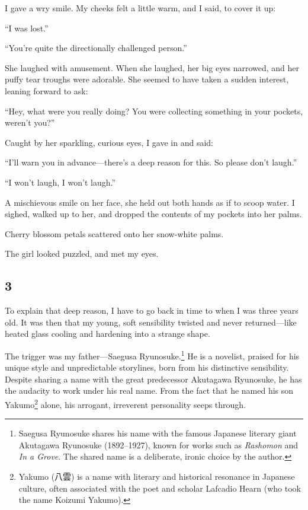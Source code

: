 \documentclass[
    a4paper,
    12pt,
    twoside,
    openany,
    UTF8,
    fontset=windows
]{ctexbook}
\begin{document}
I gave a wry smile. My cheeks felt a little warm, and I said, to cover it up:

``I was lost.''

``You're quite the directionally challenged person.''

She laughed with amusement. When she laughed, her big eyes narrowed, and her puffy tear troughs were adorable. She seemed to have taken a sudden interest, leaning forward to ask:

``Hey, what were you really doing? You were collecting something in your pockets, weren't you?''

Caught by her sparkling, curious eyes, I gave in and said:

``I'll warn you in advance---there's a deep reason for this. So please don't laugh.''

``I won't laugh, I won't laugh.''

A mischievous smile on her face, she held out both hands as if to scoop water. I sighed, walked up to her, and dropped the contents of my pockets into her palms.

Cherry blossom petals scattered onto her snow-white palms.

The girl looked puzzled, and met my eyes.


\subsection*{3}

To explain that deep reason, I have to go back in time to when I was three years old. It was then that my young, soft sensibility twisted and never returned---like heated glass cooling and hardening into a strange shape.

The trigger was my father---Saegusa Ryunosuke.\footnote{Saegusa Ryunosuke shares his name with the famous Japanese literary giant Akutagawa Ryunosuke (1892--1927), known for works such as \textit{Rashomon} and \textit{In a Grove}. The shared name is a deliberate, ironic choice by the author.} He is a novelist, praised for his unique style and unpredictable storylines, born from his distinctive sensibility. Despite sharing a name with the great predecessor Akutagawa Ryunosuke, he has the audacity to work under his real name. From the fact that he named his son Yakumo\footnote{Yakumo (八雲) is a name with literary and historical resonance in Japanese culture, often associated with the poet and scholar Lafcadio Hearn (who took the name Koizumi Yakumo).} alone, his arrogant, irreverent personality seeps through.
\end{document}
